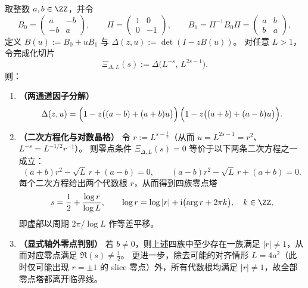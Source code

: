 \begin{theorem}\label{thm:xi-2x2-selfdual-offcritical-template}
取整数 \(a,b\in\ZZ\)，并令
\[
  B_0=\begin{pmatrix}a&-b\\-b&a\end{pmatrix},\qquad
  \Pi=\begin{pmatrix}1&0\\0&-1\end{pmatrix},\qquad
  B_1=\Pi^{-1}B_0\Pi=\begin{pmatrix}a&b\\b&a\end{pmatrix},
\]
定义
\(
B(u):=B_0+uB_1
\)
与
\(
\Delta(z,u):=\det(I-zB(u))
\)。
对任意 \(L>1\)，令完成化切片
\[
  \Xi_{\Delta,L}(s):=\Delta\!\bigl(L^{-s},\,L^{2s-1}\bigr).
\]
则：
\begin{enumerate}
  \item \textbf{（两通道因子分解）}
  \[
  \Delta(z,u)
  =\Bigl(1-z\bigl((a-b)+(a+b)u\bigr)\Bigr)\,
   \Bigl(1-z\bigl((a+b)+(a-b)u\bigr)\Bigr).
  \]
  \item \textbf{（二次方程化与对数晶格）}
  令 \(r:=L^{s-\tfrac12}\)（从而 \(u=L^{2s-1}=r^{2}\)、\(L^{-s}=L^{-1/2}r^{-1}\)）。
  则零点条件 \(\Xi_{\Delta,L}(s)=0\) 等价于以下两条二次方程之一成立：
  \[
  (a+b)r^2-\sqrt L\,r+(a-b)=0,
  \qquad
  (a-b)r^2-\sqrt L\,r+(a+b)=0.
  \]
  每个二次方程给出两个代数根 \(r\)，从而得到四族零点塔
  \[
  s=\frac12+\frac{\log r}{\log L},
  \qquad
  \log r=\log|r|+\mathrm{i}\bigl(\arg r+2\pi k\bigr),\quad k\in\ZZ,
  \]
  即虚部以周期 \(2\pi/\log L\) 作等差平移。
  \item \textbf{（显式轴外零点判别）}
  若 \(b\neq 0\)，则上述四族中至少存在一族满足 \(|r|\neq 1\)，从而对应零点满足 \(\Re(s)\neq\tfrac12\)。
  更进一步，除去可能的对齐情形 \(L=4a^2\)（此时仅可能出现 \(r=\pm 1\) 的 slice 零点）外，所有代数根均满足 \(|r|\neq 1\)，故全部零点塔都离开临界线。
\end{enumerate}
\end{theorem}

